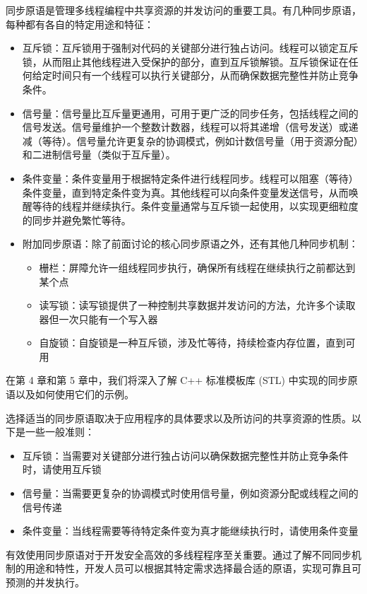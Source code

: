 

同步原语是管理多线程编程中共享资源的并发访问的重要工具。有几种同步原语，每种都有各自的特定用途和特征：

\begin{itemize}
\item
互斥锁：互斥锁用于强制对代码的关键部分进行独占访问。线程可以锁定互斥锁，从而阻止其他线程进入受保护的部分，直到互斥锁解锁。互斥锁保证在任何给定时间只有一个线程可以执行关键部分，从而确保数据完整性并防止竞争条件。

\item
信号量：信号量比互斥量更通用，可用于更广泛的同步任务，包括线程之间的信号发送。信号量维护一个整数计数器，线程可以将其递增（信号发送）或递减（等待）。信号量允许更复杂的协调模式，例如计数信号量（用于资源分配）和二进制信号量（类似于互斥量）。

\item
条件变量：条件变量用于根据特定条件进行线程同步。线程可以阻塞（等待）条件变量，直到特定条件变为真。其他线程可以向条件变量发送信号，从而唤醒等待的线程并继续执行。条件变量通常与互斥锁一起使用，以实现更细粒度的同步并避免繁忙等待。

\item
附加同步原语：除了前面讨论的核心同步原语之外，还有其他几种同步机制：

\begin{itemize}
\item
栅栏：屏障允许一组线程同步执行，确保所有线程在继续执行之前都达到某个点

\item
读写锁：读写锁提供了一种控制共享数据并发访问的方法，允许多个读取器但一次只能有一个写入器

\item
自旋锁：自旋锁是一种互斥锁，涉及忙等待，持续检查内存位置，直到可用
\end{itemize}
\end{itemize}

在第 4 章和第 5 章中，我们将深入了解 C++ 标准模板库 (STL) 中实现的同步原语以及如何使用它们的示例。


选择适当的同步原语取决于应用程序的具体要求以及所访问的共享资源的性质。以下是一些一般准则：

\begin{itemize}
\item
互斥锁：当需要对关键部分进行独占访问以确保数据完整性并防止竞争条件时，请使用互斥锁

\item
信号量：当需要更复杂的协调模式时使用信号量，例如资源分配或线程之间的信号传递

\item
条件变量：当线程需要等待特定条件变为真才能继续执行时，请使用条件变量
\end{itemize}

有效使用同步原语对于开发安全高效的多线程程序至关重要。通过了解不同同步机制的用途和特性，开发人员可以根据其特定需求选择最合适的原语，实现可靠且可预测的并发执行。



























